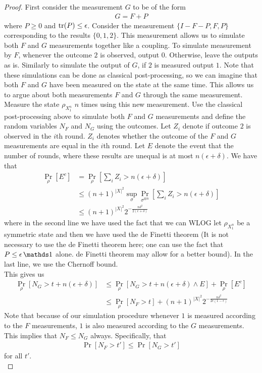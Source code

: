 \documentclass[11pt, oneside]{article}   	%
\begin{document}
\begin{proof}
    First consider the measurement $G$ to be of the form 
    \begin{align}
        G = F + P
    \end{align}
    where $P \geq 0$ and $\operatorname{tr}(P)\leq \epsilon$. Consider the measurement $\{I - F - P, F, P\}$ corresponding to the results $\{0, 1, 2\}$. This measurement allows us to simulate both $F$ and $G$ measurements together like a coupling. To simulate measurement by $F$, whenever the outcome $2$ is observed, output $0$. Otherwise, leave the outputs as is. Similarly to simulate the output of $G$, if $2$ is measured output $1$. Note that these simulations can be done as classical post-processing, so we can imagine that both $F$ and $G$ have been measured on the state at the same time. This allows us to argue about both measurements $F$ and $G$ through the same measurement.\\
    
    Measure the state $\rho_{X_1^n}$ $n$ times using this new measurement. Use the classical post-processing above to simulate both $F$ and $G$ measurements and define the random variables $N_F$ and $N_G$ using the outcomes. Let $Z_i$ denote if outcome $2$ is observed in the $i$th round. $Z_i$ denotes whether the outcome of the $F$ and $G$ measurements are equal in the $i$th round. Let $E$ denote the event that the number of rounds, where these results are unequal is at most $n(\epsilon+\delta)$. We have that 
    \begin{align*}
        \Pr_{\rho}[E^c] &= \Pr_{\rho}[\sum_i Z_i > n(\epsilon+\delta)] \\
        & \leq (n+1)^{|X|^2} \sup_{\sigma} \Pr_{\sigma^{\otimes n}} [\sum_i Z_i > n(\epsilon+\delta)] \\
        &\leq (n+1)^{|X|^2} 2^{- \frac{n \delta^2}{2(\epsilon + \delta)}}
    \end{align*}
    where in the second line we have used the fact that we can WLOG let $\rho_{X_1^n}$ be a symmetric state and then we have used the de Finetti theorem (It is not necessary to use the de Finetti theorem here; one can use the fact that $P \leq \epsilon \Id$ alone. de Finetti theorem may allow for a better bound). In the last line, we use the Chernoff bound. \\

    This gives us
    \begin{align}
        \Pr_\rho[N_G > t + n(\epsilon+\delta)] &\leq \Pr_\rho[N_G > t + n(\epsilon+\delta) \wedge E] + \Pr_{\rho}[E^c] \\
        &\leq \Pr_\rho[N_F > t ] + (n+1)^{|X|^2} 2^{- \frac{n \delta^2}{2\epsilon(1- \epsilon)}}
        \label{eq:Ng_leq_Nf}
    \end{align}
    Note that because of our simulation procedure whenever $1$ is measured according to the $F$ measurements, $1$ is also measured according to the $G$ measurements. This implies that $N_F \leq N_G$ always. Specifically, that 
    \begin{align}
        \Pr[N_F > t'] \leq \Pr[N_G > t'] 
        \label{eq:Nf_leq_Ng}
    \end{align}
    for all $t'$.\\


\end{proof}
\end{document}
